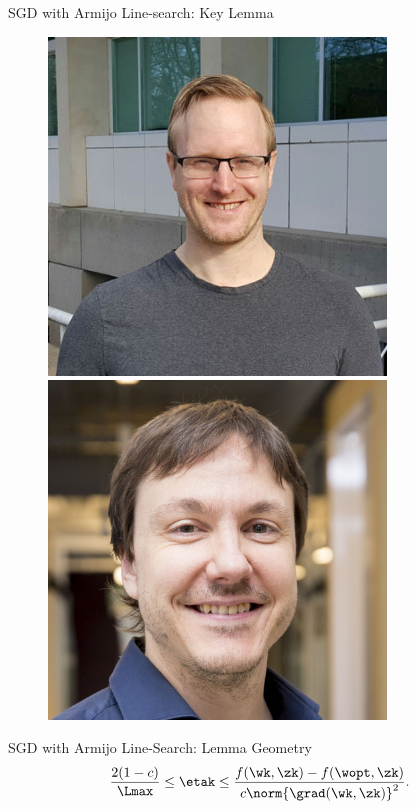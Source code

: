 \documentclass[mathserif,notheorems, hyperref={colorlinks, citecolor=blue, urlcolor=blue, linkcolor=blue}]{beamer}
\begin{document}
\begin{frame}{SGD with Armijo Line-search: Key Lemma}
\begin{minipage}[t]{0.15\textwidth}
\begin{figure}[t]
                \vspace{0.4ex}
                \includegraphics[width=0.8\textwidth]{collaborators/mark}

                \vspace{0.4ex}
                \includegraphics[width=0.8\textwidth]{collaborators/simon}
            \end{figure} 
       \end{minipage}
    \end{frame}

    \begin{frame}{SGD with Armijo Line-Search: Lemma Geometry}
        \[  \frac{2 (1-c)}{\Lmax} \leq \etak \leq \frac{f(\wk, \zk) - f(\wopt, \zk)}{c \norm{\grad(\wk, \zk)}^2}. \] 

        \vspace{1ex} 

        \begin{figure}[]
            \centering
            
        \end{figure} 

    \end{frame}
\end{document}
